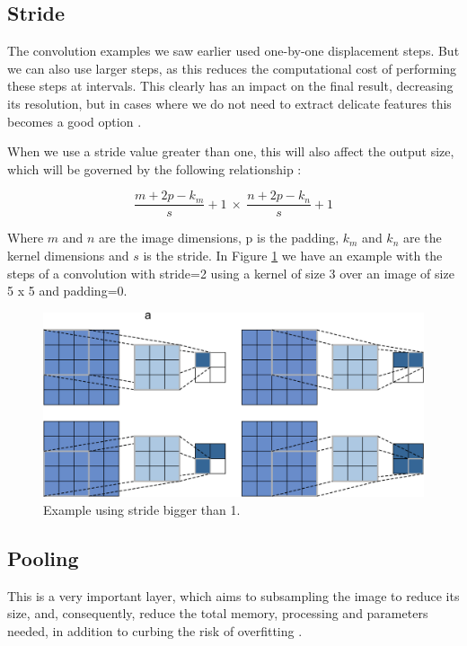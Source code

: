 \subsection{Stride}

The convolution examples we saw earlier used one-by-one displacement steps. But we can also use larger steps, as this reduces the computational cost of performing these steps at intervals. This clearly has an impact on the final result, decreasing its resolution, but in cases where we do not need to extract delicate features this becomes a good option \cite{goodfellow2016}.

When we use a stride value greater than one, this will also affect the output size, which will be governed by the following relationship \cite{adrian2017}:

\begin{equation}
\frac{m+2p-k_m}{s}+1 \  \times \ \frac{n+2p-k_n}{s}+1
\end{equation}

Where $m$ and $n$ are the image dimensions, p is the padding, $k_m$ and $k_n$ are the kernel dimensions and $s$ is the stride. In Figure \ref{fig:stride} we have an example with the steps of a convolution with stride=2 using a kernel of size 3 over an image of size 5 x 5 and padding=0.

\begin{figure}
    \centering
    \includegraphics[scale=0.20]{images/stride.png}
    \caption{Example using stride bigger than 1.}
    \label{fig:stride}
\end{figure}

\subsection{Pooling}

This is a very important layer, which aims to subsampling the image to reduce its size, and, consequently, reduce the total memory, processing and parameters needed, in addition to curbing the risk of overfitting \cite{geron2019}\cite{adrian2017}\cite{elgendy2020}.

